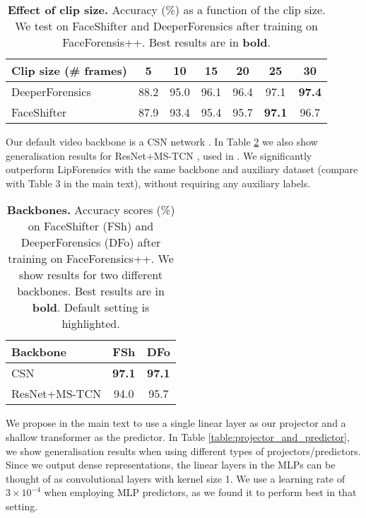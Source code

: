 \documentclass[10pt,twocolumn,letterpaper]{article}
\begin{document}
\begin{description}[wide,itemindent=\labelsep]
\begin{table}
\begin{center}
\footnotesize
\begin{tabular}{l | c c c c c c}\toprule
Clip size (\# frames) & 5 & 10 & 15 & 20 & 25 & 30 \\ \midrule
DeeperForensics & 88.2 & 95.0 & 96.1 & 96.4 & 97.1 & \textbf{97.4} \\
FaceShifter & 87.9 & 93.4 & 95.4 & 95.7 & \textbf{97.1} & 96.7 \\
 \bottomrule
\end{tabular}
\end{center}
\caption{\textbf{Effect of clip size.} Accuracy (\%) as a function of the clip size. We test on FaceShifter and DeeperForensics after training on FaceForensis++. Best results are in \textbf{bold}.}
\label{table:clip_size}
\end{table}

\item[Different backbone.] Our default video backbone is a CSN network \cite{tran2019video}. In Table \ref{table:backbone} we also show generalisation results for ResNet+MS-TCN \cite{martinez2020lipreading}, used in \cite{haliassos2021lips}. We significantly outperform LipForensics with the same backbone and auxiliary dataset (compare with Table 3 in the main text), without requiring any auxiliary labels.

\begin{table}
\begin{center}
\begin{tabular}{l c c}\toprule
Backbone & FSh & DFo \\ \midrule
\rowcolor{light-gray}
CSN & \textbf{97.1} & \textbf{97.1} \\
ResNet+MS-TCN & 94.0 & 95.7 \\ \bottomrule
\end{tabular}
\end{center}
\caption{\textbf{Backbones.} Accuracy scores (\%) on FaceShifter (FSh) and DeeperForensics (DFo) after training on FaceForensics++. We show results for two different backbones. Best results are in \textbf{bold}. Default setting is \colorbox{light-gray}{highlighted}.}
\label{table:backbone}
\end{table}

\item[Projector and predictor.] We propose in the main text to use a single linear layer as our projector and a shallow transformer as the predictor. In Table \ref{table:projector_and_predictor}, we show generalisation results when using different types of projectors/predictors. Since we output dense representations, the linear layers in the MLPs can be thought of as convolutional layers with kernel size 1. We use a learning rate of $3\times 10^{-4}$ when employing MLP predictors, as we found it to perform best in that setting. 


\end{description}
\end{document}

